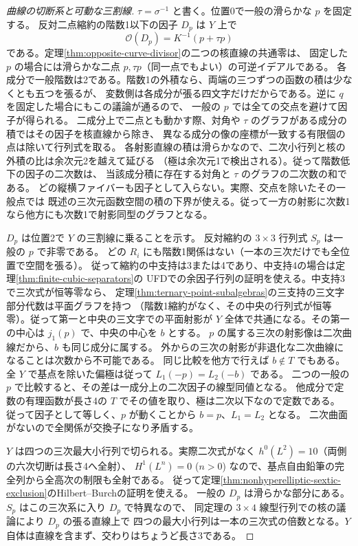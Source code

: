 \begin{proof}[曲線の切断系と可動な三割線]
$\tau=\sigma^{-1}$ と書く。位置0で一般の滑らかな $p$ を固定する。
反対二点縮約の階数1以下の因子 $D_p$ は $Y$ 上で
\[
                   \mathcal O(D_p)=K^{-1}(p+\tau p)
\tag{*}
\]
である。定理\ref{thm:opposite-curve-divisor}の二つの核直線の共通零は、
固定した $p$ の場合には滑らかな二点 $p,\tau p$（同一点でもよい）の可逆イデアルである。
各成分で一般階数は2である。階数1の外積なら、両端の三つずつの函数の積は少なくとも五つを張るが、
変数側は各成分が張る四文字だけだからである。逆に $q$ を固定した場合にもこの議論が通るので、
一般の $p$ では全ての交点を避けて因子が得られる。
二成分上で二点とも動かす際、対角や $\tau$ のグラフがある成分の積ではその因子を核直線から除き、
異なる成分の像の座標が一致する有限個の点は除いて行列式を取る。
各射影直線の積は滑らかなので、二次小行列と核の外積の比は余次元2を越えて延びる
（極は余次元1で検出される）。従って階数低下の因子の二次数は、
当該成分積に存在する対角と $\tau$ のグラフの二次数の和である。
どの縦横ファイバーも因子として入らない。実際、交点を除いたその一般点では
既述の三次元函数空間の積の下界が使える。従って一方の射影に次数1なら他方にも次数1で射影同型のグラフとなる。

$D_p$ は位置2で $Y$ の三割線に乗ることを示す。
反対縮約の $3\times3$ 行列式 $S_p$ は一般の $p$ で非零である。
どの $R_i$ にも階数1関係はない（一本の三次だけでも全位置で空間を張る）。
従って縮約の中支持は3または4であり、中支持4の場合は定理\ref{thm:finite-cubic-separators}の
UFDでの余因子行列の証明を使える。中支持3で三次式が恒等零なら、
定理\ref{thm:ternary-point-subalgebras}の三支持の三文字部分代数は平面グラフを持つ
（階数1縮約がなく、その中央の行列式が恒等零）。従って第一と中央の三文字での平面射影が
$Y$ 全体で共通になる。その第一の中心は $j_1(p)$ で、中央の中心を $b$ とする。
$p$ の属する三次の射影像は二次曲線だから、$b$ も同じ成分に属する。
外からの三次の射影が非退化な二次曲線になることは次数から不可能である。
同じ比較を他方で行えば $b\notin T$ でもある。
全 $Y$ で基点を除いた偏極は従って $L_1(-p)=L_2(-b)$ である。
二つの一般の $p$ で比較すると、その差は一成分上の二次因子の線型同値となる。
他成分で定数の有理函数が長さ4の $T$ でその値を取り、極は二次以下なので定数である。
従って因子として等しく、$p$ が動くことから $b=p$、$L_1=L_2$ となる。
二次曲面がないので全関係が交換子になり矛盾する。

$Y$ は四つの三次最大小行列で切られる。実際二次式がなく
$h^0(L^2)=10$（両側の六次切断は長さ4へ全射）、
$H^1(L^n)=0$ ($n>0$) なので、基点自由鉛筆の完全列から全高次の制限も全射である。
従って定理\ref{thm:nonhyperelliptic-sextic-exclusion}のHilbert--Burchの証明を使える。
一般の $D_p$ は滑らかな部分にある。$S_p$ はこの三次系に入り $D_p$ で特異なので、
同定理の $3\times4$ 線型行列での核の議論により $D_p$ の張る直線上で
四つの最大小行列は一本の三次式の倍数となる。$Y$ 自体は直線を含まず、交わりはちょうど長さ3である。


\end{proof}
